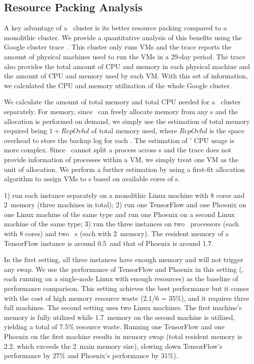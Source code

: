 \documentclass[10pt,times,twocolumn]{z2-article}
\begin{document}
{{{{{{{


\subsection{Resource Packing Analysis}
\label{sec:cost}
A key advantage of a \lego\ cluster is its better resource packing compared to a monolithic cluster.
We provide a quantitative analysis of this benefits using the Google cluster trace~\cite{GoogleTrace}.
This cluster only runs VMs and the trace reports the amount of physical machines used to run the VMs 
in a 29-day period. 
The trace also provides the total amount of CPU and memory in each physical machine
and the amount of CPU and memory used by each VM.
With this set of information, we calculated the CPU and memory utilization of the whole Google cluster.

We calculate the amount of total memory and total CPU needed for a \lego\ cluster separately.
For memory, since \lego\ can freely allocate memory from any \mcomponent{}s and the allocation is performed on demand, 
we simply use the estimation of total memory required being {\small{$1+RepOvhd$}} of total memory used,
where {\small{$RepOvhd$}} is the space overhead to store the backup log for each \mcomponent.
The estimation of \lego' CPU usage is more complex.
Since \lego\ cannot split a process across \pcomponent{}s and the trace does not provide information of 
processes within a VM, we simply treat one VM as the unit of allocation.
We perform a further estimation by using a first-fit allocation algorithm to assign VMs to \pcomponent{}s 
based on available cores of \pcomponent{}s.


1) run each instance separately on a monolithic Linux machine with 8 cores and 2\GB\ memory (three machines in total);
2) run one TensorFlow and one Phoenix on one Linux machine of the same type and 
run one Phoenix on a second Linux machine of the same type;
3) run the three instances on two \lego\ processors (each with 8 cores) and two \lego\ \mcomponent s (each with 2\GB\ memory).
The resident memory of a TensorFlow instance is around 0.5\GB\ and that of Phoenix is around 1.7\GB.

In the first setting, all three instances have enough memory and will not trigger any swap. 
We use the performance of TensorFlow and Phoenix in this setting (\ie, each running on a single-node Linux with enough resources)
as the baseline of performance comparison.
This setting achieves the best performance but it comes with the cost of high memory resource waste (2.1/6 = 35\%),
and it requires three full machines.
The second setting uses two Linux machines. 
The first machine's memory is fully utilized while 1.7\GB\ memory on the second machine is utilized, yielding a total of 7.5\% resource waste.
Running one TensorFlow and one Phoenix on the first machine results in memory swap (total resident memory is 2.2\GB, which exceeds the 2\GB\ main memory size),
slowing down TensorFlow's performance by 27\% and Phoenix's performance by 31\%).

}}}}}}}
\end{document}
